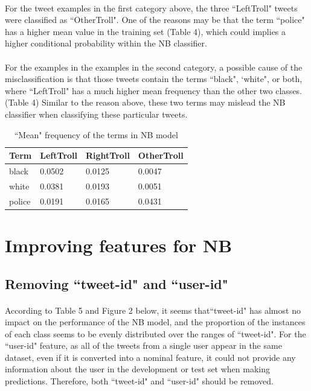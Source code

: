 \documentclass[11pt]{article}
\begin{document}
\paragraph{} For the tweet examples in the first category above, the three ``LeftTroll" tweets were classified as ``OtherTroll". One of the reasons may be that the term ``police" has a higher mean value in the training set (Table 4), which could implies a higher conditional probability within the NB classifier.

\paragraph{} For the examples in the examples in the second category, a possible cause of the misclassification is that those tweets contain the terms ``black", `white", or both, where ``LeftTroll" has a much higher mean frequency than the other two classes. (Table 4) Similar to the reason above, these two terms may mislead the NB classifier when classifying these particular tweets.

\begin{table}[!htbp]
 \begin{center}
\begin{tabular}{| l | l | l | l |}
      \hline
      Term & LeftTroll & RightTroll & OtherTroll \\
      \hline\hline
      black & 0.0502 & 0.0125 & 0.0047 \\
      white & 0.0381 & 0.0193 & 0.0051 \\
      police & 0.0191 & 0.0165 & 0.0431 \\
      \hline
\end{tabular}
\caption{``Mean" frequency of the terms in NB model}\label{table2}
 \end{center}
\end{table}


\section{Improving features for NB}
\subsection{Removing ``tweet-id" and ``user-id"}

\paragraph{} According to Table 5 and Figure 2 below, it seems that``tweet-id" has almost no impact on the performance of the NB model, and the proportion of the instances of each class seems to be evenly distributed over the ranges of ``tweet-id". For the ``user-id" feature, as all of the tweets from a single user appear in the same dataset, even if it is converted into a nominal feature, it could not provide any information about the user in the development or test set when making predictions. Therefore, both ``tweet-id" and ``user-id" should be removed.
\end{document}
